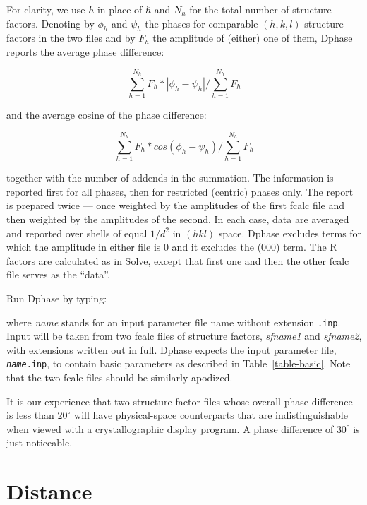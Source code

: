 \documentclass{report}
\begin{document}
{\vspace {0.1in}

For clarity, we use $h$ in place of $\hbar$ 
and $N_h$ for the total number of structure factors.
Denoting by $\phi_h$ and $\psi_h$ the phases for comparable $(h,k,l)$
structure factors in the two files and by $F_h$ the amplitude of (either)
one of them, Dphase reports the average phase difference:

$$ \sum_{h=1}^{N_h} {F_h * |\phi_h - \psi_h|}  / \sum_{h=1}^{N_h} {F_h}$$

and the average cosine of the phase difference:

$$ \sum_{h=1}^{N_h} {F_h * cos(\phi_h - \psi_h)}  / \sum_{h=1}^{N_h} {F_h}$$

together with the number of addends in the summation.
The information is reported first for all phases,
then for restricted (centric) phases only.
The report is prepared twice --- once weighted by the amplitudes of
the first fcalc file and then weighted by the amplitudes of
the second.  In each case, data are averaged and reported over shells 
of equal $1/d^2$ in $(h k l)$ space.
Dphase excludes terms for which the amplitude in either file is 
0 and it excludes the (000) term.
The R factors are calculated as in Solve, except that first one and then 
the other fcalc file serves as the ``data''.
   
\vspace {0.1in}

Run Dphase by typing:


where {\it name} stands for an input parameter file name
without extension {\tt .inp}.
Input will be taken from two fcalc files of structure factors, 
{\it sfname1} and {\it sfname2}, with extensions written out in full.
Dphase expects the input parameter file, {\tt {\it name}.inp}, to contain 
basic parameters as described in Table~\ref{table-basic}.
Note that the two fcalc files should be similarly apodized.

\vspace {0.1in}

It is our experience that two structure factor files whose overall phase 
difference is less than $20^\circ$ will have physical-space counterparts that
are indistinguishable when viewed with a crystallographic display program.
A phase difference of $30^\circ$ is just noticeable.


\section {Distance}
\label{evaluation-distance}

}
\end{document}
